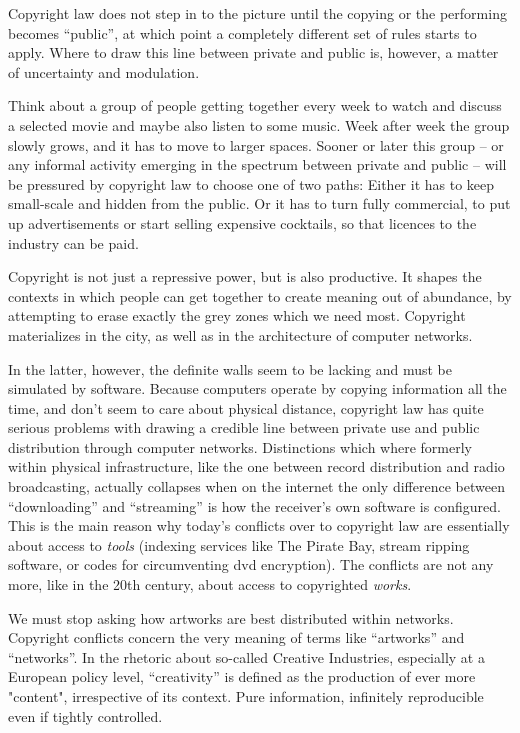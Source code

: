 Copyright law does not step in to the picture until the copying or the
performing becomes ``public'', at which point a completely dif\hbox{}ferent set
of rules starts to apply. Where to draw this line between private and public is,
however, a matter of uncertainty and modulation.

Think about a group of people getting together every week to watch and discuss a
selected movie and maybe also listen to some music. Week after week the group
slowly grows, and it has to move to larger spaces. Sooner or later this group –
or any informal activity emerging in the spectrum between private and public –
will be pressured by copyright law to choose one of two paths: Either it has to
keep small-scale and hidden from the public. Or it has to turn fully commercial,
to put up advertisements or start selling expensive cocktails, so that licences
to the industry can be paid.

Copyright is not just a repressive power, but is also productive. It shapes the
contexts in which people can get together to create meaning out of abundance, by
attempting to erase exactly the grey zones which we need most. Copyright
materializes in the city, as well as in the architecture of computer networks.

In the latter, however, the def\hbox{}inite walls seem to be lacking and must be
simulated by software. Because computers operate by copying information all the
time, and don't seem to care about physical distance, copyright law has quite
serious problems with drawing a credible line between private use and public
distribution through computer networks. Distinctions which where formerly within
physical infrastructure, like the one between record distribution and radio
broadcasting, actually collapses when on the internet the only dif\hbox{}ference
between ``downloading'' and ``streaming'' is how the receiver's own software is
conf\hbox{}igured. This is the main reason why today's conf\hbox{}licts over to
copyright law are essentially about access to \textit{tools} (indexing services
like The Pirate Bay, stream ripping software, or codes for circumventing dvd
encryption).  The conf\hbox{}licts are not any more, like in the 20th century,
about access to copyrighted \textit{works}.

We must stop asking how artworks are best distributed within networks. Copyright
conf\hbox{}licts concern the very meaning of terms like ``artworks'' and
``networks''.  In the rhetoric about so-called Creative Industries, especially
at a European policy level, ``creativity'' is def\hbox{}ined as the production
of ever more "content", irrespective of its context. Pure information,
inf\hbox{}initely reproducible even if tightly controlled.

